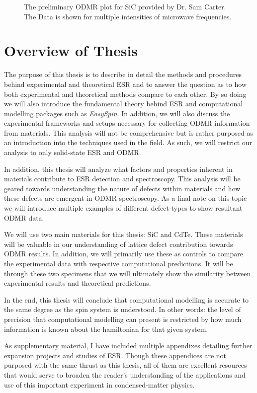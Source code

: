 \documentclass[oneside, astronomy, noacknowlegments]{BYUPhys}
\begin{document}
\begin{figure}
    \caption[Preliminary ODMR data]{\label{fig:PrelimODMR}
     The preliminary ODMR plot for SiC provided by Dr. Sam Carter. The Data is shown for multiple intensities of microwave frequencies.}
\end{figure}

\section{Overview of Thesis}

The purpose of this thesis is to describe in detail the methods and procedures behind experimental and theoretical ESR and to answer the question as to how both experimental and theoretical methods compare to each other. By so doing we will also introduce the fundamental theory behind ESR and computational modelling packages such as \textit{EasySpin}. In addition, we will also discuss the experimental frameworks and setups necessary for collecting ODMR information from materials. This analysis will not be comprehensive but is rather purposed as an introduction into the techniques used in the field. As such, we will restrict our analysis to only solid-state ESR and ODMR.

In addition, this thesis will analyze what factors and properties inherent in materials contribute to ESR detection and spectroscopy. This analysis will be geared towards understanding the nature of defects within materials and how these defects are emergent in ODMR spectroscopy. As a final note on this topic we will introduce multiple examples of different defect-types to show resultant ODMR data.

We will use two main materials for this thesis: SiC and CdTe. These materials will be valuable in our understanding of lattice defect contribution towards ODMR results. In addition, we will primarily use these as controls to compare the experimental data with respective computational predictions. It will be through these two specimens that we will ultimately show the similarity between experimental results and theoretical predictions.

In the end, this thesis will conclude that computational modelling is accurate to the same degree as the spin system is understood. In other words: the level of precision that computational modelling can present is restricted by how much information is known about the hamiltonian for that given system.

As supplementary material, I have included multiple appendixes detailing further expansion projects and studies of ESR. Though these appendices are not purposed with the same thrust as this thesis, all of them are excellent resources that would serve to broaden the reader's understanding of the applications and use of this important experiment in condensed-matter physics.
\end{document}
